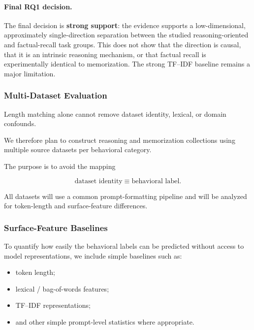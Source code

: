\documentclass[11pt]{article}
\begin{document}
\paragraph{Final RQ1 decision.}
The final decision is \textbf{strong support}: the evidence supports a low-dimensional, approximately single-direction separation between the studied reasoning-oriented and factual-recall task groups. This does not show that the direction is causal, that it is an intrinsic reasoning mechanism, or that factual recall is experimentally identical to memorization. The strong TF--IDF baseline remains a major limitation.

\subsubsection{Multi-Dataset Evaluation}

Length matching alone cannot remove dataset identity, lexical, or
domain confounds.

We therefore plan to construct reasoning and memorization collections
using multiple source datasets per behavioral category.

The purpose is to avoid the mapping

\[
\text{dataset identity}
\equiv
\text{behavioral label}.
\]

All datasets will use a common prompt-formatting pipeline and will be
analyzed for token-length and surface-feature differences.


\subsubsection{Surface-Feature Baselines}

To quantify how easily the behavioral labels can be predicted without
access to model representations, we include simple baselines such as:

\begin{itemize}

    \item token length;

    \item lexical / bag-of-words features;

    \item TF--IDF representations;

    \item and other simple prompt-level statistics where appropriate.

\end{itemize}
\end{document}
